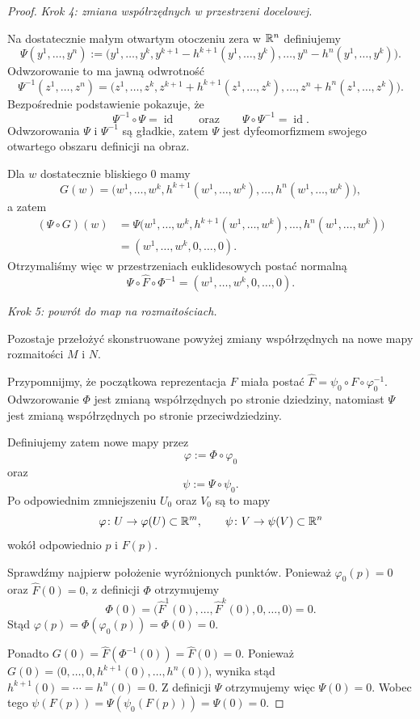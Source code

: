 \begin{proof}
\medskip
\emph{Krok 4: zmiana współrzędnych w przestrzeni docelowej.}

Na dostatecznie małym otwartym otoczeniu zera w $\mathbb{R}^n$
definiujemy
\[
\Psi(y^1,\dots,y^n)
:=
\bigl(
y^1,\dots,y^k,
y^{k+1}-h^{k+1}(y^1,\dots,y^k),
\dots,
y^n-h^n(y^1,\dots,y^k)
\bigr).
\]
Odwzorowanie to ma jawną odwrotność
\[
\Psi^{-1}(z^1,\dots,z^n)
=
\bigl(
z^1,\dots,z^k,
z^{k+1}+h^{k+1}(z^1,\dots,z^k),
\dots,
z^n+h^n(z^1,\dots,z^k)
\bigr).
\]
Bezpośrednie podstawienie pokazuje, że
\[
\Psi^{-1}\circ\Psi=\operatorname{id}
\qquad\text{oraz}\qquad
\Psi\circ\Psi^{-1}=\operatorname{id}.
\]
Odwzorowania $\Psi$ i $\Psi^{-1}$ są gładkie, zatem $\Psi$
jest dyfeomorfizmem swojego otwartego obszaru definicji na obraz.

Dla $w$ dostatecznie bliskiego $0$ mamy
\[
G(w) = \bigl( w^1,\dots,w^k, h^{k+1}(w^1,\dots,w^k), \dots, h^n(w^1,\dots,w^k) \bigr),
\]
a zatem
\begin{align*}
(\Psi\circ G)(w)
&=
\Psi\bigl(
w^1,\dots,w^k,
h^{k+1}(w^1,\dots,w^k),
\dots,
h^n(w^1,\dots,w^k)
\bigr)\\
&=
(w^1,\dots,w^k,0,\dots,0).
\end{align*}
Otrzymaliśmy więc w przestrzeniach euklidesowych postać normalną
\[
\Psi\circ\widehat F\circ\Phi^{-1}
= (w^1,\dots,w^k,0,\dots,0).
\]

\medskip
\emph{Krok 5: powrót do map na rozmaitościach.}

Pozostaje przełożyć skonstruowane powyżej zmiany współrzędnych
na nowe mapy rozmaitości $M$ i $N$.

Przypomnijmy, że początkowa reprezentacja $F$ miała postać $\widehat F = \psi_0\circ F\circ\varphi_0^{-1}$.
Odwzorowanie $\Phi$ jest zmianą współrzędnych po stronie dziedziny,
natomiast $\Psi$ jest zmianą współrzędnych po stronie przeciwdziedziny.

Definiujemy zatem nowe mapy przez
\[
\boxed{ \varphi:=\Phi\circ\varphi_0 }
\]
oraz
\[
\boxed{ \psi:=\Psi\circ\psi_0. }
\]
Po odpowiednim zmniejszeniu $U_0$ oraz $V_0$ są to mapy
\[
\varphi\colon U\to\varphi(U)\subset\mathbb{R}^m, \qquad \psi\colon V\to\psi(V)\subset\mathbb{R}^n
\]
wokół odpowiednio $p$ i $F(p)$.

Sprawdźmy najpierw położenie wyróżnionych punktów. Ponieważ $\varphi_0(p)=0$
oraz $\widehat F(0)=0$,
z definicji $\Phi$ otrzymujemy
\[
\Phi(0) = \bigl( \widehat F^1(0),\dots,\widehat F^k(0), 0,\dots,0 \bigr) = 0.
\]
Stąd $\varphi(p) = \Phi(\varphi_0(p)) = \Phi(0) = 0$.

Ponadto $G(0) = \widehat F(\Phi^{-1}(0)) = \widehat F(0) = 0$.
Ponieważ $G(0) = \bigl( 0,\dots,0, h^{k+1}(0),\dots,h^n(0) \bigr)$,
wynika stąd $h^{k+1}(0)=\cdots=h^n(0)=0$.
Z definicji $\Psi$ otrzymujemy więc $\Psi(0)=0$.
Wobec tego $\psi(F(p)) = \Psi(\psi_0(F(p))) = \Psi(0) = 0$.


\end{proof}
